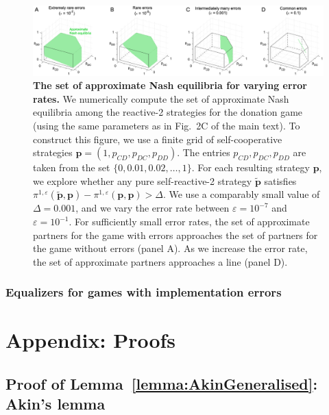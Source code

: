 \documentclass[9pt,twoside,lineno]{pnas-new}
\theoremstyle{plainCl1}
\theoremstyle{plainCl2}
\begin{document}
\begin{figure}[t!]
    \centering
    \includegraphics[width=\textwidth]{../../figures/ApproxmiateNash_strict.eps}
    \caption{\textbf{The set of approximate Nash equilibria for varying error rates.} We numerically compute the set of approximate Nash equilibria among the reactive-2 strategies for the donation game (using the same parameters as in Fig.~2C of the main text). To construct this figure, we use a finite grid of self-cooperative strategies $\mathbf{p}\!=\!(1,p_{CD},p_{DC},p_{DD})$. The entries $p_{CD},p_{DC},p_{DD}$ are taken from the set $\{0,0.01,0.02,\ldots,1\}$. For each resulting strategy $\mathbf{p}$, we explore whether any pure self-reactive-2 strategy $\mathbf{\tilde p}$ satisfies $\pi^{1,\varepsilon}(\mathbf{\tilde p},\mathbf{p}) - \pi^{1,\varepsilon}(\mathbf{p},\mathbf{p}) > \Delta$. We use a comparably small value of $\Delta\!=\!0.001$, and we vary the error rate between $\varepsilon\!=\!10^{-7}$ and $\varepsilon\!=\!10^{-1}$. For sufficiently small error rates, the set of approximate partners for the game with errors approaches the set of partners for the game without errors (panel A). As we increase the error rate, the set of approximate partners approaches a line (panel D).}
    \label{fig:ApproximateNash}
\end{figure}

\subsubsection*{Equalizers for games with implementation errors}



\clearpage
\newpage




\section{Appendix: Proofs}
\label{section:appendix}


\subsection{Proof of Lemma~\ref{lemma:AkinGeneralised}: Akin's lemma}
\end{document}
